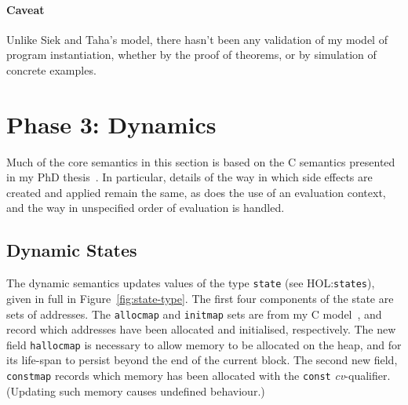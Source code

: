 \documentclass[11pt]{article}
\newcommand{\HOLfile}[1]{HOL:\texttt{#1}}
\begin{document}
\paragraph{Caveat} Unlike Siek and Taha's model, there hasn't been any
validation of my model of program instantiation, whether by the proof
of theorems, or by simulation of concrete examples.





\section{Phase 3: Dynamics}
\label{sec:phase3}

Much of the core semantics in this section is based on the C semantics
presented in my PhD thesis~\cite{Norrish98}.  In particular, details
of the way in which side effects are created and applied remain the
same, as does the use of an evaluation context, and the way in
unspecified order of evaluation is handled. 

\subsection{Dynamic States}
\label{sec:dynamic-states}

The dynamic semantics updates values of the type \texttt{state} (see
\HOLfile{states}), given in full in Figure~\ref{fig:state-type}.  The
first four components of the state are sets of addresses.  The
\texttt{allocmap} and \texttt{initmap} sets are from my C
model~\cite{Norrish98}, and record which addresses have been allocated
and initialised, respectively.  The new field \texttt{hallocmap} is
necessary to allow memory to be allocated on the heap, and for its
life-span to persist beyond the end of the current block.  The second
new field, \texttt{constmap} records which memory has been allocated
with the \texttt{const} \emph{cv}-qualifier.  (Updating such memory
causes undefined behaviour.)
\end{document}
